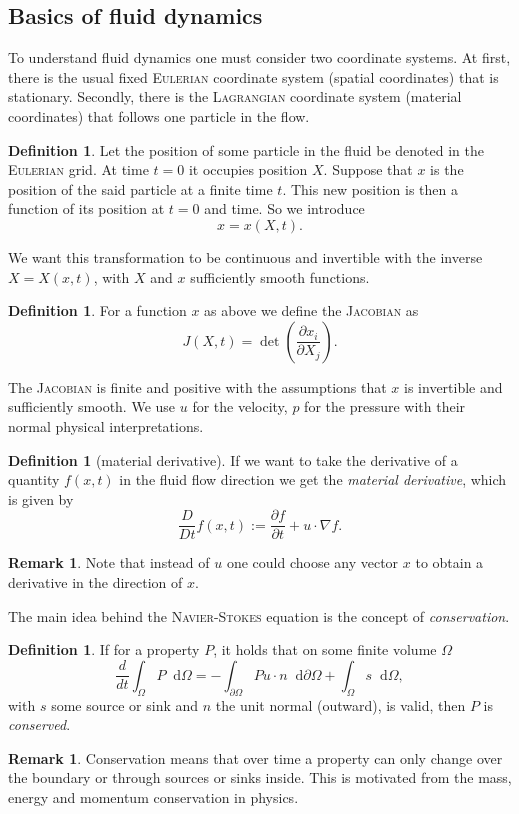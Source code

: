 \documentclass[12pt,a4paper,twoside, open=right]{scrreprt}
\theoremstyle{definition}
\newtheorem{rem}[auf]{Remark}
\newtheorem{defn}[auf]{Definition}
\theoremstyle{plain}
\newcommand{\D}{\mathop{}\!\mathrm{d}}
\begin{document}
\subsection{Basics of fluid dynamics}
To understand fluid dynamics one must consider two coordinate systems. At first, there is the usual fixed \textsc{Eulerian} coordinate system (spatial coordinates) that is stationary. Secondly, there is the \textsc{Lagrangian} coordinate system (material coordinates) that follows one particle in the flow. 
\begin{defn}
    Let the position of some particle in the fluid be denoted in the \textsc{Eulerian} grid. At time $t=0$ it occupies position $X$. Suppose that $x$ is the position of the said particle at a finite time $t$. This new position is then a function of its position at $t=0$ and time. So we introduce
    \begin{equation}
        x=x(X,t).
    \end{equation}
\end{defn}
We want this transformation to be continuous and invertible with the inverse $X=X(x,t)$, with $X$ and $x$ sufficiently smooth functions. 
\begin{defn}
    For a function $x$ as above we define the \textsc{Jacobian} as
    \begin{equation}
        J(X,t)= \det\left(\frac{\partial x_i}{\partial X_j}\right).
    \end{equation}
\end{defn}
The \textsc{Jacobian} is finite and positive with the assumptions that $x$ is invertible and sufficiently smooth. We use $u$ for the velocity, $p$ for the pressure with their normal physical interpretations.
\begin{defn}[material derivative]
    If we want to take the derivative of a quantity $f(x,t)$ in the fluid flow direction we get the \emph{material derivative}, which is given by 
    \begin{equation}
        \frac{D}{Dt}f(x,t):=\frac{\partial f}{\partial t} + u\cdot\nabla f.
    \end{equation}
\end{defn}
\begin{rem}
    Note that instead of $u$ one could choose any vector $x$ to obtain a derivative in the direction of $x$.
\end{rem}
The main idea behind the \textsc{Navier-Stokes} equation is the concept of \emph{conservation}. 
\begin{defn}
    If for a property $P$, it holds that on some finite volume $\Omega$
    \begin{equation}
        \frac{d}{dt}\int_\Omega P\D\Omega = -\int_{\partial\Omega}Pu\cdot n\D\partial\Omega+\int_\Omega s\D\Omega,\label{eq:conservation}
    \end{equation}
   with $s$ some source or sink and $n$ the unit normal (outward), is valid, then $P$ is \emph{conserved}.
\end{defn}
\begin{rem}
    Conservation means that over time a property can only change over the boundary or through sources or sinks inside. This is motivated from the mass, energy and momentum conservation in physics.
\end{rem}
\end{document}

